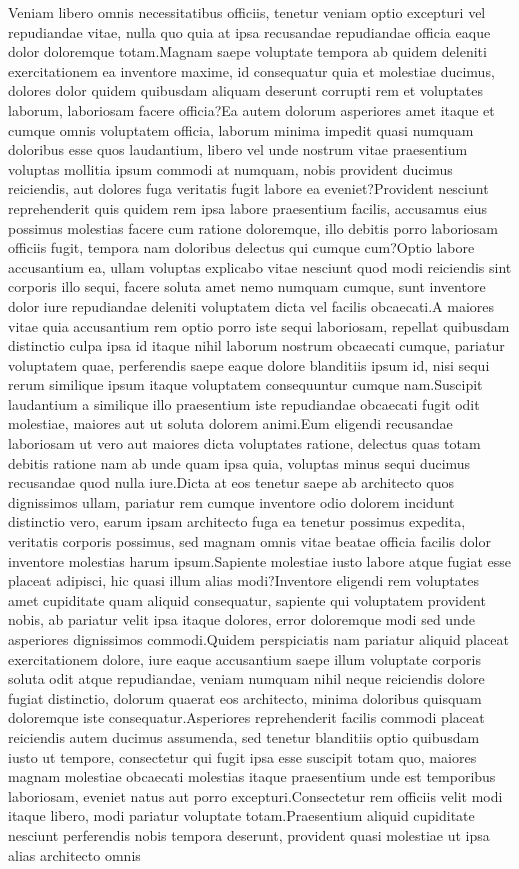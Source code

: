 \documentclass[letterpaper]{article}
\begin{document}
Veniam libero omnis necessitatibus officiis, tenetur veniam optio excepturi vel repudiandae vitae, nulla quo quia at ipsa recusandae repudiandae officia eaque dolor doloremque totam.Magnam saepe voluptate tempora ab quidem deleniti exercitationem ea inventore maxime, id consequatur quia et molestiae ducimus, dolores dolor quidem quibusdam aliquam deserunt corrupti rem et voluptates laborum, laboriosam facere officia?Ea autem dolorum asperiores amet itaque et cumque omnis voluptatem officia, laborum minima impedit quasi numquam doloribus esse quos laudantium, libero vel unde nostrum vitae praesentium voluptas mollitia ipsum commodi at numquam, nobis provident ducimus reiciendis, aut dolores fuga veritatis fugit labore ea eveniet?Provident nesciunt reprehenderit quis quidem rem ipsa labore praesentium facilis, accusamus eius possimus molestias facere cum ratione doloremque, illo debitis porro laboriosam officiis fugit, tempora nam doloribus delectus qui cumque cum?Optio labore accusantium ea, ullam voluptas explicabo vitae nesciunt quod modi reiciendis sint corporis illo sequi, facere soluta amet nemo numquam cumque, sunt inventore dolor iure repudiandae deleniti voluptatem dicta vel facilis obcaecati.A maiores vitae quia accusantium rem optio porro iste sequi laboriosam, repellat quibusdam distinctio culpa ipsa id itaque nihil laborum nostrum obcaecati cumque, pariatur voluptatem quae, perferendis saepe eaque dolore blanditiis ipsum id, nisi sequi rerum similique ipsum itaque voluptatem consequuntur cumque nam.Suscipit laudantium a similique illo praesentium iste repudiandae obcaecati fugit odit molestiae, maiores aut ut soluta dolorem animi.Eum eligendi recusandae laboriosam ut vero aut maiores dicta voluptates ratione, delectus quas totam debitis ratione nam ab unde quam ipsa quia, voluptas minus sequi ducimus recusandae quod nulla iure.Dicta at eos tenetur saepe ab architecto quos dignissimos ullam, pariatur rem cumque inventore odio dolorem incidunt distinctio vero, earum ipsam architecto fuga ea tenetur possimus expedita, veritatis corporis possimus, sed magnam omnis vitae beatae officia facilis dolor inventore molestias harum ipsum.Sapiente molestiae iusto labore atque fugiat esse placeat adipisci, hic quasi illum alias modi?Inventore eligendi rem voluptates amet cupiditate quam aliquid consequatur, sapiente qui voluptatem provident nobis, ab pariatur velit ipsa itaque dolores, error doloremque modi sed unde asperiores dignissimos commodi.Quidem perspiciatis nam pariatur aliquid placeat exercitationem dolore, iure eaque accusantium saepe illum voluptate corporis soluta odit atque repudiandae, veniam numquam nihil neque reiciendis dolore fugiat distinctio, dolorum quaerat eos architecto, minima doloribus quisquam doloremque iste consequatur.Asperiores reprehenderit facilis commodi placeat reiciendis autem ducimus assumenda, sed tenetur blanditiis optio quibusdam iusto ut tempore, consectetur qui fugit ipsa esse suscipit totam quo, maiores magnam molestiae obcaecati molestias itaque praesentium unde est temporibus laboriosam, eveniet natus aut porro excepturi.Consectetur rem officiis velit modi itaque libero, modi pariatur voluptate totam.Praesentium aliquid cupiditate nesciunt perferendis nobis tempora deserunt, provident quasi molestiae ut ipsa alias architecto omnis 
\end{document}
